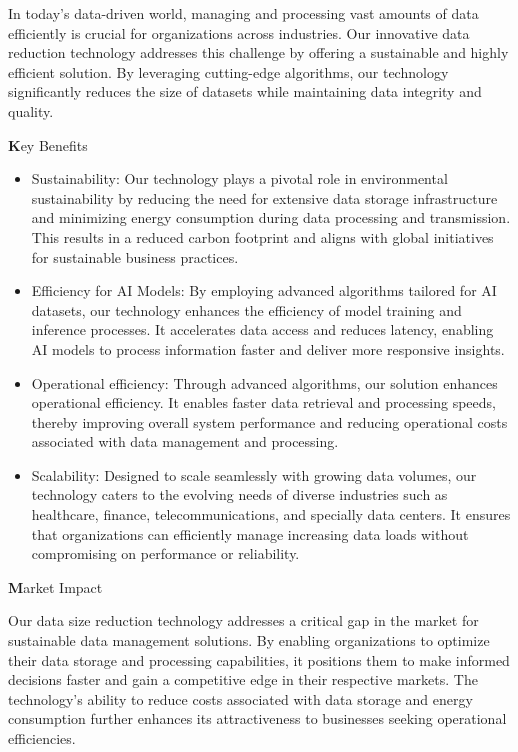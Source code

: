 In today's data-driven world, managing and processing vast amounts of data efficiently is crucial for organizations across industries. Our innovative data reduction technology addresses this challenge by offering a sustainable and highly efficient solution. By leveraging cutting-edge algorithms, our technology significantly reduces the size of datasets while maintaining data integrity and quality.

{\textbf Key Benefits}

\begin{itemize}
\item Sustainability: Our technology plays a pivotal role in environmental sustainability by reducing the need for extensive data storage infrastructure and minimizing energy consumption during data processing and transmission. This results in a reduced carbon footprint and aligns with global initiatives for sustainable business practices.

\item Efficiency for AI Models: By employing advanced algorithms tailored for AI datasets, our technology enhances the efficiency of model training and inference processes. It accelerates data access and reduces latency, enabling AI models to process information faster and deliver more responsive insights.

\item Operational efficiency: Through advanced algorithms, our solution enhances operational efficiency. It enables faster data retrieval and processing speeds, thereby improving overall system performance and reducing operational costs associated with data management and processing.

\item Scalability: Designed to scale seamlessly with growing data volumes, our technology caters to the evolving needs of diverse industries such as healthcare, finance, telecommunications, and specially data centers. It ensures that organizations can efficiently manage increasing data loads without compromising on performance or reliability.

\end{itemize}

{\textbf Market Impact}

Our data size reduction technology addresses a critical gap in the market for sustainable data management solutions. By enabling organizations to optimize their data storage and processing capabilities, it positions them to make informed decisions faster and gain a competitive edge in their respective markets. The technology's ability to reduce costs associated with data storage and energy consumption further enhances its attractiveness to businesses seeking operational efficiencies.

